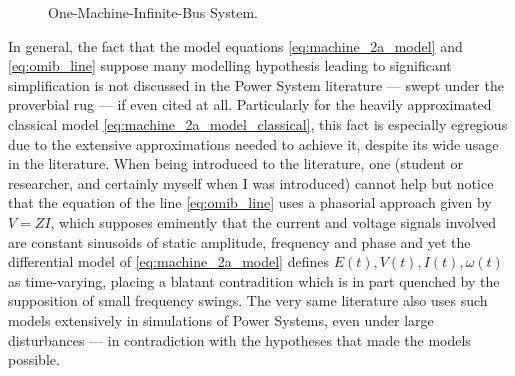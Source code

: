\begin{figure}[h]
\centering

  	\caption{One-Machine-Infinite-Bus System.}
	\label{fig:example_omib}
\end{figure} %

	In general, the fact that the model equations \eqref{eq:machine_2a_model} and \eqref{eq:omib_line} suppose many modelling hypothesis leading to significant simplification is not discussed in the Power System literature — swept under the proverbial rug —  if even cited at all. Particularly for the heavily approximated classical model \eqref{eq:machine_2a_model_classical}, this fact is especially egregious due to the extensive approximations needed to achieve it, despite its wide usage in the literature. When being introduced to the literature, one (student or researcher, and certainly myself when I was introduced) cannot help but notice that the equation of the line \eqref{eq:omib_line} uses a phasorial approach given by $V = ZI$, which supposes eminently that the current and voltage signals involved are constant sinusoids of static amplitude, frequency and phase and yet the differential model of \eqref{eq:machine_2a_model} defines $E(t),V(t),I(t),\omega(t)$ as time-varying, placing a blatant contradition which is in part quenched by the supposition of small frequency swings. The very same literature also uses such models extensively in simulations of Power Systems, even under large disturbances — in contradiction with the hypotheses that made the models possible. 

